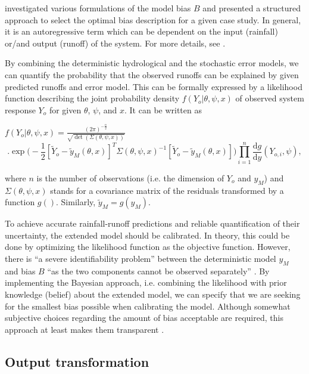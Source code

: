 \documentclass{ctuthesis}\usepackage[]{graphicx}\usepackage[]{color}
\begin{document}
\cite{giudice2013improving} investigated various formulations of the model bias $B$ and  presented a structured approach to select the optimal bias description
for a given case study. In general, it is an autoregressive term which can be dependent on the input (rainfall) or/and output (runoff) of the system. For more details, see \cite{giudice2013improving}.


By combining the deterministic hydrological and the stochastic error models, we can quantify the probability that the observed runoffs can be explained by given predicted runoffs and error model. This can be formally expressed by a likelihood function describing the joint probability density $f(Y_o|\theta, \psi, x)$ of observed system response $Y_o$ for given $\theta$, $\psi$, and $x$. It can be written as

$ f (Y_o|\theta, \psi, x) = \frac{(2\pi)^{-\frac{n}{2}}}{\sqrt{\det(\Sigma(\theta, \psi, x))}} $
\begin{equation} \label{likelih}
. \exp \Big( -\frac{1}{2}  [ \tilde{Y}_{o} - \tilde{y}_{M}(\theta, x)]^{T}  \Sigma(\theta, \psi, x)^{-1}  [ \tilde{Y}_{o} - \tilde{y}_{M}(\theta, x)] \Big)  \prod^{n}_{i=1} \frac{\text{d}g}{\text{d}y} (Y_{o,i},\psi) ,
\end{equation}

where $n$ is the number of observations (i.e. the dimension of $Y_{o}$ and $y_{M}$) and $\Sigma(\theta, \psi, x)$ stands for a covariance matrix of the residuals transformed by a function $g()$. Similarly, $\tilde{y}_M=g(y_M)$.


To achieve accurate rainfall-runoff predictions and reliable quantification of their uncertainty, the extended model should be calibrated. In theory, this could be done by optimizing the likelihood function as the objective function. However, there is \enquote{a severe identifiability problem} between the deterministic model $y_M$ and bias $B$ \enquote{as the two components cannot be observed separately} \citep{reichert2012linking}. By implementing the Bayesian approach, i.e. combining the likelihood with prior knowledge (belief) about the extended model, we can specify that we are seeking for the smallest bias possible when calibrating the model. Although somewhat subjective choices regarding the amount of bias acceptable are required, this approach at least makes them transparent \citep{reichert2012linking}.




\subsection{Output transformation} \label{transfTheor}
\end{document}
